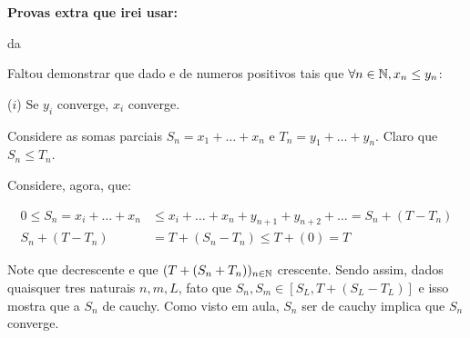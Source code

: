 \textbf{Provas extra que irei usar:}

\criterio da \comparacao

Faltou demonstrar que dado  e  \sequencias de numeros positivos tais que $\forall n \in \mathbb{N}, x_n \leq y_n$:

($i$) Se \series{\N} $y_i$ converge, \entao \series{\N} $x_i$ converge.

Considere as somas parciais $S_n = x_1 + \ldots + x_n$ e $T_n = y_1 + \ldots + y_n$. Claro que $S_n \leq T_n$.

Considere, agora, que:

\begin{align*}
	0\leq S_n = x_i + \ldots + x_n &\leq x_i + \ldots + x_n + y_{n+1} + y_{n+2} + \ldots = S_n + (T - T_n) \\
	S_n + (T - T_n) &= T + (S_n - T_n) \leq T + (0) = T
\end{align*}

Note que  \eh \nao decrescente e que $(T + (S_n + T_n))_{n\in\mathbb{N}}$ \eh \nao crescente. Sendo assim, dados quaisquer tres naturais $n,m,L$, \eh fato que $S_n, S_m \in [S_L, T + (S_L - T_L)]$ e isso mostra que a \sequencia $S_n$ \eh de cauchy. Como visto em aula, $S_n$ ser de cauchy implica que \series{\N} $S_n$ converge.

